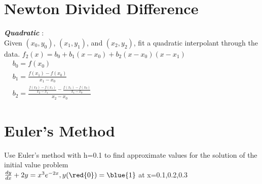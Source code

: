 \section*{Newton Divided Difference}
\textbf{\textit{Quadratic}} :\\[0.5em]
Given $(x_0,y_0)$, $(x_1, y_1)$, and $(x_2,y_2)$, fit a quadratic interpolant through the data. $f_2(x) = b_0 + b_1 (x-x_0) + b_2 (x-x_0)(x-x_1)$ \\[0.5em]
$\begin{aligned}
   & b_0 = f(x_0) \\
   & b_1 = \frac{f(x_1) - f(x_0)}{x_1 - x_0} \\[0.5em]
   & b_2 = \frac{\frac{f(x_2) - f(x_1)}{x_2 - x_1} - \frac{f(x_1) - f(x_0)}{x_1 - x_0}}{x_2 - x_0}
\end{aligned}$

\pagebreak
\section*{Euler's Method}
Use Euler's method with h=0.1 to find approximate values for the solution of the initial value problem\\[0.2em]
$\frac{dy}{dx}+2y= x^3e^{-2x}, y(\red{0})=\blue{1}$
at x=0.1,0.2,0.3



